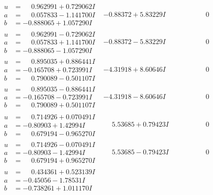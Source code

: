\documentclass[1p]{elsarticle_modified}
\theoremstyle{definition}
\begin{document}
$$\begin{array}{c|c|c}
\begin{aligned}
u &= \phantom{-}0.962991 + 0.729062 I \\
a &= \phantom{-}0.057833 - 1.141700 I \\
b &= -0.888065 + 1.057290 I\end{aligned}
 & -0.88372 + 5.83229 I & \phantom{-0.000000 } 0 \\ \hline\begin{aligned}
u &= \phantom{-}0.962991 - 0.729062 I \\
a &= \phantom{-}0.057833 + 1.141700 I \\
b &= -0.888065 - 1.057290 I\end{aligned}
 & -0.88372 - 5.83229 I & \phantom{-0.000000 } 0 \\ \hline\begin{aligned}
u &= \phantom{-}0.895035 + 0.886441 I \\
a &= -0.165708 + 0.723991 I \\
b &= \phantom{-}0.790089 - 0.501107 I\end{aligned}
 & -4.31918 + 8.60646 I & \phantom{-0.000000 } 0 \\ \hline\begin{aligned}
u &= \phantom{-}0.895035 - 0.886441 I \\
a &= -0.165708 - 0.723991 I \\
b &= \phantom{-}0.790089 + 0.501107 I\end{aligned}
 & -4.31918 - 8.60646 I & \phantom{-0.000000 } 0 \\ \hline\begin{aligned}
u &= \phantom{-}0.714926 + 0.070491 I \\
a &= -0.80903 + 1.42994 I \\
b &= \phantom{-}0.679194 - 0.965270 I\end{aligned}
 & \phantom{-}5.53685 + 0.79423 I & \phantom{-0.000000 } 0 \\ \hline\begin{aligned}
u &= \phantom{-}0.714926 - 0.070491 I \\
a &= -0.80903 - 1.42994 I \\
b &= \phantom{-}0.679194 + 0.965270 I\end{aligned}
 & \phantom{-}5.53685 - 0.79423 I & \phantom{-0.000000 } 0 \\ \hline\begin{aligned}
u &= \phantom{-}0.434361 + 0.523139 I \\
a &= -0.45056 - 1.78531 I \\
b &= -0.738261 + 1.011170 I\end{aligned}

\end{array}$$
\end{document}
